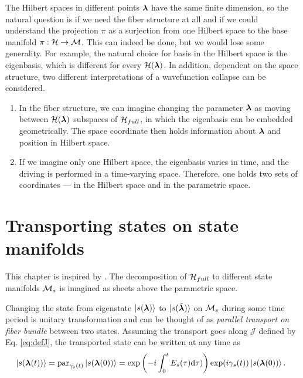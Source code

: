 The Hilbert spaces in different points ${\bm\lambda}$ have the same finite dimension, so the natural question is if we need the fiber structure at all and if we could understand the projection $\pi$ as a surjection from one Hilbert space to the base manifold $\pi: \mathcal{H}\rightarrow \mathcal{M}$. This can indeed be done, but we would lose some generality. For example, the natural choice for basis in the Hilbert space is the eigenbasis, which is different for every $\mathcal{H}({\bm\lambda})$. In addition, dependent on the space structure, two different interpretations of a wavefunction collapse can be considered.
\begin{enumerate}
    \item In the fiber structure, we can imagine changing the parameter ${\bm\lambda}$ as moving between $\mathcal{H}({\bm\lambda})$ subspaces of $\mathcal{H}_{full}$, in which the eigenbasis can be embedded geometrically. The space coordinate then holds information about ${\bm\lambda}$ and position in Hilbert space. 
    \item If we imagine only one Hilbert space, the eigenbasis varies in time, and the driving is performed in a time-varying space. Therefore, one holds two sets of coordinates — in the Hilbert space and in the parametric space.
\end{enumerate}







\section{Transporting states on state manifolds}
This chapter is inspired by \citet{berry1984}. The decomposition of $\mathcal{H}_{full}$ to different state manifolds $\mathcal{M}_s$ is imagined as sheets above the parametric space. 


Changing the state from eigenstate $\ket{s({\bm\lambda})}$ to $\ket{s(\tilde{{\bm\lambda}})}$ on $\mathcal{M}_s$ during some time period is unitary transformation and can be thought of as \emph{parallel transport on fiber bundle} between two states. Assuming the transport goes along $\mathcal J$ defined by Eq. \ref{eq:defJ}, the transported state can be written at any time as
\begin{equation}
    \hspace{-5pt}\ket{s({\bm\lambda}(t))} = \textrm{par}_{\gamma_s(t)}\ket{s({\bm\lambda}(0))} = \exp\left(-i\int_0^tE_s(\tau)\mathrm{d}\tau)\right)\exp(i\gamma_s(t))\ket{s({\bm\lambda}(0))}.
    \label{eq:phasesOnManifold}
\end{equation}


